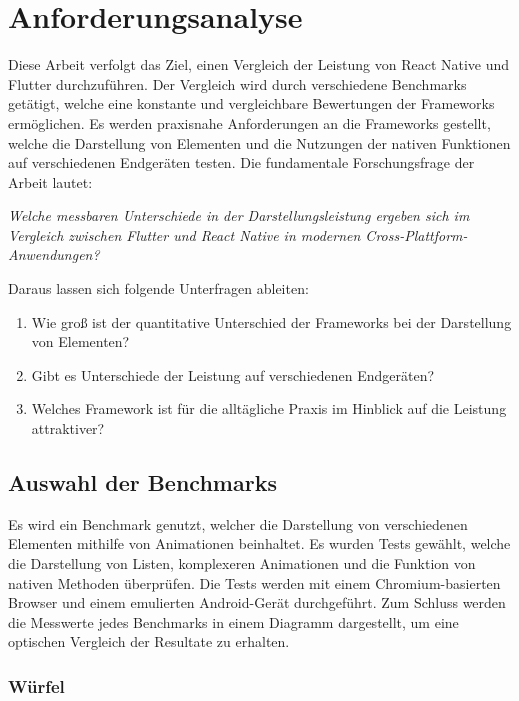 \section{Anforderungsanalyse}

Diese Arbeit verfolgt das Ziel, einen Vergleich der Leistung von React Native und Flutter durchzuführen. Der Vergleich wird durch verschiedene Benchmarks getätigt, welche eine konstante und vergleichbare Bewertungen der Frameworks ermöglichen. Es werden praxisnahe Anforderungen an die Frameworks gestellt, welche die Darstellung von Elementen und die Nutzungen der nativen Funktionen auf verschiedenen Endgeräten testen. Die fundamentale Forschungsfrage der Arbeit lautet:

\textit{Welche messbaren Unterschiede in der Darstellungsleistung ergeben sich im Vergleich zwischen Flutter und React Native in modernen Cross-Plattform-Anwendungen?}

Daraus lassen sich folgende Unterfragen ableiten:

\begin{enumerate}
    \item Wie groß ist der quantitative Unterschied der Frameworks bei der Darstellung von Elementen?
    \item Gibt es Unterschiede der Leistung auf verschiedenen Endgeräten?
    \item Welches Framework ist für die alltägliche Praxis im Hinblick auf die Leistung attraktiver?
\end{enumerate}

\subsection*{Auswahl der Benchmarks}

Es wird ein Benchmark genutzt, welcher die Darstellung von verschiedenen Elementen mithilfe von Animationen beinhaltet. Es wurden Tests gewählt, welche die Darstellung von Listen, komplexeren Animationen und die Funktion von nativen Methoden überprüfen. Die Tests werden mit einem Chromium-basierten Browser und einem emulierten Android-Gerät durchgeführt. Zum Schluss werden die Messwerte jedes Benchmarks in einem Diagramm dargestellt, um eine optischen Vergleich der Resultate zu erhalten.

\subsubsection*{Würfel}

